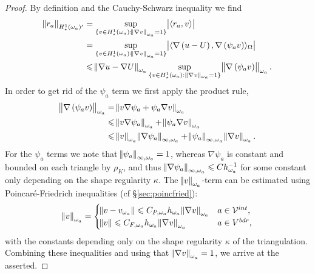 \documentclass[thesis.tex]{subfiles}
\begin{document}
\begin{proof}
  By definition and the Cauchy-Schwarz inequality we find
  \begin{align*}
    \norm{r_a}_{H_\star^1(\omega_a)'} &= \sup_{\{v \in H_\star^1(\omega_a) : \norm{\nabla v}_{\omega_a} = 1\}} \abs{\langle r_a, v \rangle}\\
    &= \sup_{\{v \in H_\star^1(\omega_a) : \norm{\nabla v}_{\omega_a} = 1\}} \abs{\langle \nabla \left(u - U\right), \nabla \left(\psi_a v\right) \rangle_\Omega} \\
    &\leqslant \norm{\nabla u - \nabla U}_{\omega_a} \sup_{\{v \in H_\star^1(\omega_a): \|\nabla v\|_{\omega_a}=1\}} \norm{ \nabla \left (\psi_a v \right)}_{\omega_a}.
  \end{align*}
  In order to get rid of the $\psi_a$ term we first apply the product rule,
  \begin{align*}
    \norm{\nabla\left(\psi_a v\right)}_{\omega_a} &= \norm{v \nabla \psi_a + \psi_a \nabla v}_{\omega_a}\\
    &\leqslant \norm{v \nabla \psi_a}_{\omega_a} + \norm{\psi_a \nabla v}_{\omega_a} \\
    &\leqslant \norm{v}_{\omega_a} \norm{\nabla \psi_a}_{\infty, \omega_a} + \norm{\psi_a}_{\infty, \omega_a} \norm{\nabla v}_{\omega_a}.
  \end{align*}
 For the $\psi_a$ terms we note that 
  $\norm{\psi_a}_{\infty, \omega_a} = 1$, whereas $\nabla \psi_a$ is constant and bounded on each triangle by
  $\rho_{K}$, and thus $\norm{\nabla \psi_a}_{\infty, \omega_a} \leqslant C h^{-1}_{\omega_a}$ for some constant only depending on the 
  shape regularity $\kappa$. 
  The $\norm{v}_{\omega_a}$-term can be estimated using Poincar\'e-Friedrich inequalities (cf \S\ref{sec:poincfried}):
  \[
    \norm{v}_{\omega_a} = \begin{cases}
      \norm{v - v_{\omega_a}} \leqslant C_{P,\omega_a} h_{\omega_a}\norm{\nabla v}_{\omega_a} & a \in \mathcal{V}^{int}, \\
      \norm{v} \leqslant C_{F,\omega_a} h_{\omega_a}\norm{\nabla v}_{\omega_a} & a \in V^{bdr},
    \end{cases}
  \]
  with the constants depending only on the shape regularity $\kappa$ of the triangulation.
  Combining these inequalities and using that $\norm{\nabla v}_{\omega_a} = 1$, we arrive at the asserted.
\end{proof}
\end{document}
